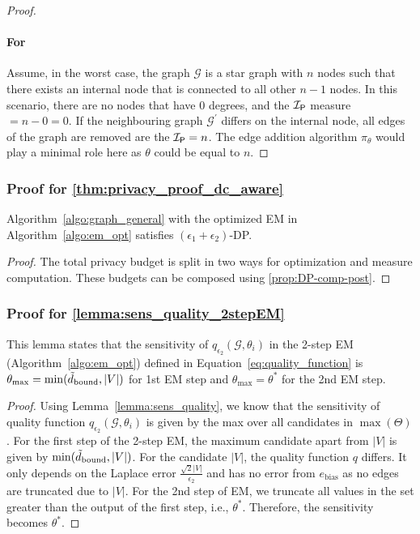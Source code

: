 \begin{proof}
\paragraph{For \problematic}
Assume, in the worst case, the graph $\mathcal{G}$ is a star graph with $n$ nodes such that there exists an internal node that is connected to all other $n-1$ nodes. In this scenario, there are no nodes that have 0 degrees, and the $\mathcal{I_\mathsf{P}}$ measure $= n-0 = 0$. If the neighbouring graph $\mathcal{G}^\prime$ differs on the internal node, all edges of the graph are removed are the $\mathcal{I_\mathsf{P}} = n$. The edge addition algorithm $\pi_\theta$ would play a minimal role here as $\theta$ could be equal to $n$.
\end{proof}

\subsubsection{Proof for \cref{thm:privacy_proof_dc_aware}}
\label{app:privacy_proof_dc_aware}

    Algorithm~\ref{algo:graph_general} with the optimized EM in  Algorithm~\ref{algo:em_opt} satisfies $(\epsilon_1 + \epsilon_2)$-DP.

\begin{proof}
    The total privacy budget is split in two ways for optimization and measure computation. These budgets can be composed using \cref{prop:DP-comp-post}. 
\end{proof}


\subsubsection{Proof for \cref{lemma:sens_quality_2stepEM}}
\label{app:sens_quality_2stepEM}
This lemma states that the sensitivity of $q_{\epsilon_2}(\mathcal{G}, \theta_i)$ in the 2-step EM (Algorithm~\ref{algo:em_opt})
defined in Equation~\eqref{eq:quality_function} is $\theta_{\max}= \min(\tilde{d}_{\normalfont{\text{bound}}},|V|)$ for 1st EM step and $\theta_{\max}=\theta^*$ for the 2nd EM step.

\begin{proof}
Using Lemma~\ref{lemma:sens_quality}, we know that the sensitivity of quality function $q_{\epsilon_2}(\mathcal{G}, \theta_i)$ is given by the max over all candidates in $\max(\Theta)$. For the first step of the 2-step EM, the maximum candidate apart from $|V|$ is given by $\min(\tilde{d}_{\normalfont{\text{bound}}},|V|)$. For the candidate $|V|$, the quality function $q$ differs. It only depends on the Laplace error $\frac{\sqrt{2}|V|}{\epsilon_2}$ and has no error from $e_{\text{bias}}$ as no edges are truncated due to $|V|$. For the 2nd step of EM, we truncate all values in the set greater than the output of the first step, i.e., $\theta^*$. Therefore, the sensitivity becomes $\theta^*$.
\end{proof}



